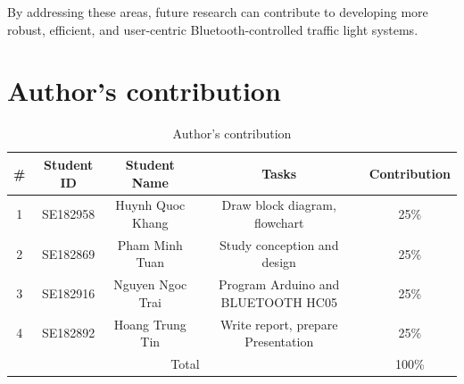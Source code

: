 \documentclass[conference, onecolumn]{IEEEtran}
\begin{document}
By addressing these areas, future research can contribute to developing more robust, efficient, and user-centric Bluetooth-controlled traffic light systems.\\


\section{Author's contribution}
    

\begin{table}[h!]
\centering
\caption{Author's contribution}
\label{tab:my_label}
\begin{tabular}{|c|c|c|c|c|}
\hline
\#& Student ID & Student Name & Tasks & Contribution\\
\hline
1& SE182958& Huynh Quoc Khang& Draw block diagram, flowchart& 25\%\\
\hline
2& SE182869& Pham Minh Tuan& Study conception and design& 25\%\\
\hline
3& SE182916& Nguyen Ngoc Trai& Program Arduino and BLUETOOTH HC05& 25\%\\
\hline
4& SE182892& Hoang Trung Tin& Write report, prepare Presentation& 25\%\\
\hline
\multicolumn{4}{|c|}{Total}& 100\%\\
\hline
\end{tabular}
\end{table}
\end{document}
